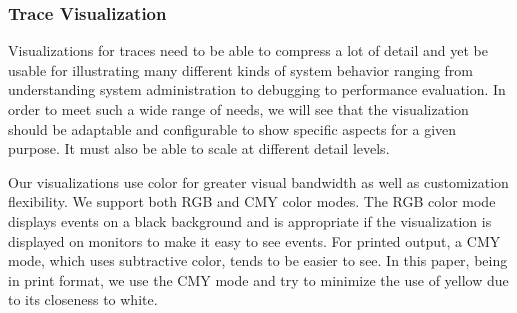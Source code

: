 
\subsubsection{Trace Visualization}
\label{sec:vis}

Visualizations for traces need to be able to compress a lot of detail
and yet be usable for illustrating many different
kinds of system behavior ranging from understanding
system administration to debugging to performance evaluation.
In order to meet such a wide range of needs, we will see that the visualization
should be adaptable and configurable to show specific aspects for a
given purpose.  It must also be able to scale at different detail levels.


Our visualizations use color for greater visual
bandwidth as well as customization flexibility. 
We support both RGB and CMY color modes.
The RGB color mode displays events on a black background
and is appropriate if the visualization is displayed on monitors to 
make it easy to see events.
For printed output, a CMY mode, which uses subtractive color,
tends to be easier to see.
In this paper, being in print format, we use the CMY mode
and try to minimize the use of yellow due to its closeness to white.


